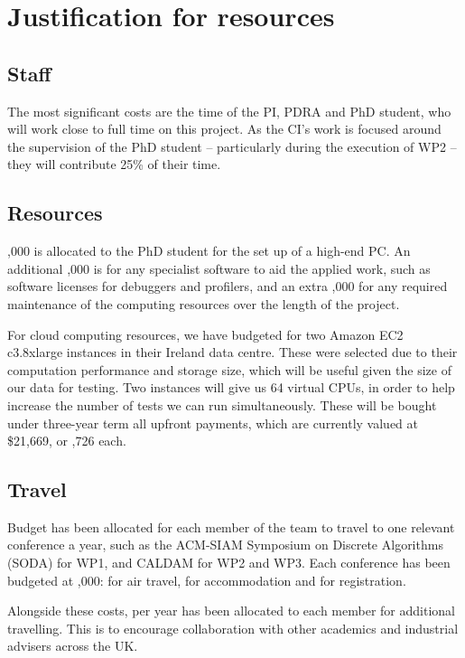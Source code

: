 \documentclass[a4paper,11pt]{article}
\begin{document}
    \section{Justification for resources}

    \subsection{Staff}

    The most significant costs are the time of the PI, PDRA and PhD student, who will work close to full time on this project. As the CI's work is focused around the supervision of the PhD student -- particularly during the execution of WP2 -- they will contribute 25\% of their time.

    \subsection{Resources}

    ,000 is allocated to the PhD student for the set up of a high-end PC. An additional ,000 is for any specialist software to aid the applied work, such as software licenses for debuggers and profilers, and an extra ,000 for any required maintenance of the computing resources over the length of the project.

    For cloud computing resources, we have budgeted for two Amazon EC2 c3.8xlarge instances in their Ireland data centre. These were selected due to their computation performance and storage size, which will be useful given the size of our data for testing. Two instances will give us 64 virtual CPUs, in order to help increase the number of tests we can run simultaneously. These will be bought under three-year term all upfront payments, which are currently valued at \$21,669, or ,726 each.

    \subsection{Travel}

    Budget has been allocated for each member of the team to travel to one relevant conference a year, such as the ACM-SIAM Symposium on Discrete Algorithms (SODA) for WP1, and CALDAM for WP2 and WP3. Each conference has been budgeted at ,000:  for air travel,  for accommodation and  for registration.

    Alongside these costs,  per year has been allocated to each member for additional travelling. This is to encourage collaboration with other academics and industrial advisers across the UK.
\end{document}
